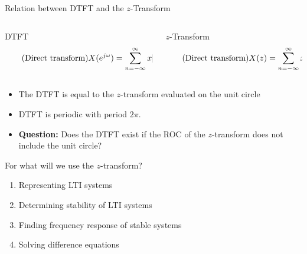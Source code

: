 \documentclass[10pt]{beamer}
\begin{document}
%
\begin{frame}{Relation between DTFT and the $z$-Transform}

\begin{columns}[t]
	\begin{column}{0.5\textwidth}
		\begin{block}{DTFT}
			\vspace{-0.5cm}
			\begin{equation} \tag{Direct transform}
			X(e^{j\omega}) = \sum_{n=-\infty}^{\infty} x[n]\tikz[baseline]{
				\node[fill=blue!20,anchor=base] (t1) {$e^{-j\omega n}$};
			}
			\end{equation}
		\end{block}
	\end{column}
	\begin{column}{0.5\textwidth}
		\begin{block}{$z$-Transform}
			\vspace{-0.2cm}
			\begin{equation} \tag{Direct transform}
			X(z) = \sum_{n=-\infty}^{\infty} x[n]\tikz[baseline]{
				\node[fill=blue!20,anchor=base] (t1) {$z^{-n}$};
			}
			\end{equation}
		\end{block}
	\end{column}
\end{columns}
\vspace{0.4cm}
\begin{itemize}
	\pause\item The DTFT is equal to the $z$-transform evaluated on the unit circle
	\item DTFT is periodic with period $2\pi$.
	\pause\item \textbf{Question:} Does the DTFT exist if the ROC of the $z$-transform does not include the unit circle?
\end{itemize}

\vspace{-0.4cm}
\flushright
\resizebox{0.35\linewidth}{!}{}
\end{frame}

%
\begin{frame}{For what will we use the $z$-transform?}
	\begin{enumerate}
		\item Representing LTI systems
		\item Determining stability of LTI systems
		\item Finding frequency response of stable systems
		\item Solving difference equations
	\end{enumerate}
\end{frame}
\end{document}
